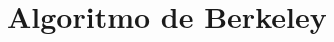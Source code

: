 \documentclass[letterpaper]{article}
\begin{document}

\tableofcontents{}

\section{Algoritmo de Berkeley}\label{sec:algor-de-berk}

\renewcommand\listoflistingscaption{Lista de códigos}
\listoflistings\@
\end{document}
